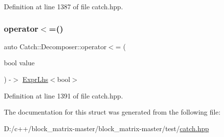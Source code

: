 Definition at line 1387 of file catch.\+hpp.

\mbox{\label{struct_catch_1_1_decomposer_aac129b94903ae1339d5709049d83613b}} 
\subsubsection{\texorpdfstring{operator$<$=()}{operator<=()}\hspace{0.1cm}{\footnotesize\ttfamily [2/2]}}
{\footnotesize\ttfamily auto Catch\+::\+Decomposer\+::operator$<$= (\begin{DoxyParamCaption}\item[{bool}]{value }\end{DoxyParamCaption}) -\/$>$ \mbox{\hyperlink{class_catch_1_1_expr_lhs}{Expr\+Lhs}}$<$bool$>$ \hspace{0.3cm}{\ttfamily [inline]}}



Definition at line 1391 of file catch.\+hpp.



The documentation for this struct was generated from the following file\+:\begin{DoxyCompactItemize}
\item 
D\+:/c++/block\+\_\+matrix-\/master/block\+\_\+matrix-\/master/test/\mbox{\hyperlink{catch_8hpp}{catch.\+hpp}}\end{DoxyCompactItemize}
